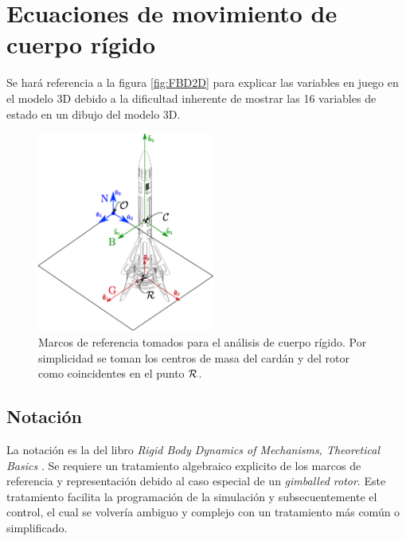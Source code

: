 
\section{Ecuaciones de movimiento de cuerpo rígido} \label{sec:ecuacionesRigid}
Se hará referencia a la figura \ref{fig:FBD2D} para explicar las variables en juego en el modelo 3D debido a la dificultad inherente de mostrar las 16 variables de estado en un dibujo del modelo 3D.

\begin{figure}[htb!]
	\centering
	\includegraphics[width=0.52\textwidth]{fig/marcosDiagrama.eps}
	\caption{Marcos de referencia tomados para el análisis de cuerpo rígido. Por simplicidad se toman los centros de masa del cardán y del rotor como coincidentes en el punto $\mathcal{R}$.}
\end{figure}

\subsection{Notación}

La notación es la del libro \textit{Rigid Body Dynamics of Mechanisms, Theoretical Basics} \cite{hahn2013rigid}. Se requiere un tratamiento algebraico explicito de los marcos de referencia y representación debido al caso especial de un \textit{gimballed rotor}. Este tratamiento facilita la programación de la simulación y subsecuentemente el control, el cual se volvería ambiguo y complejo con un tratamiento más común o simplificado.

